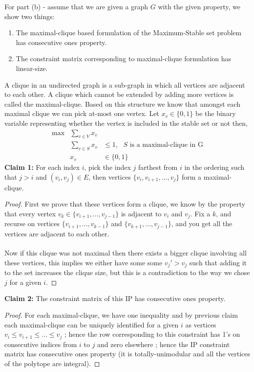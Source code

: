 \documentclass{article}
\numberwithin{equation}{section}
\begin{document}
For part (b) - assume that we are given a graph $G$ with the given property, we show two things: 
\begin{enumerate}
    \item The maximal-clique based formulation of the Maximum-Stable set problem has consecutive ones property. 
    \item The constraint matrix corresponding to maximal-clique formulation has linear-size. 
\end{enumerate}
A clique in an undirected graph is a sub-graph in which all vertices are adjacent to each other. A clique which cannot be extended by adding more vertices is called the maximal-clique. Based on this structure we know that amongst each maximal clique we can pick at-most one vertex. Let $x_v\in \{0, 1\}$ be the binary variable representing whether the vertex is included in the stable set or not then, 
\begin{equation}
    \begin{array}{crl}
        \max & \sum_{v \in V} x_v &\\
         & \sum_{v\in S} x_v &\le 1, \, \, \, \, S \text{ is a maximal-clique in G}\\
         & x_v&\in \{0, 1\}
    \end{array}
\end{equation}
\textbf{Claim 1:} For each index $i$, pick the index $j$ farthest from $i$ in the ordering such that $j > i$ and $(v_i, v_j) \in E$, then vertices $\{v_i, v_{i+1}, \dots, v_j\}$ form a maximal-clique. 
\begin{proof}
    First we prove that these vertices form a clique, we know by the property that every vertex $v_k\in \{v_{i+1}, \dots, v_{j-1}\}$ is adjacent to $v_i$ and $v_j$. Fix a $k$, and recurse on vertices $\{v_{i+1}, \dots, v_{k-1}\}$ and $\{v_{k+1}, \dots, v_{j-1}\}$, and you get all the vertices are adjacent to each other.\\\\
    Now if this clique was not maximal then there exists a bigger clique involving all these vertices, this implies we either have some some $v_j'>v_j$ such that adding it to the set increases the clique size, but this is a contradiction to the way we chose $j$ for a given $i$. 
 \end{proof}
 \noindent \textbf{Claim 2:} The constraint matrix of this IP has consecutive ones property. 
 \begin{proof}
     For each maximal-clique, we have one inequality and by previous claim each maximal-clique can be uniquely identified for a given $i$ as vertices $v_i\le v_{i+1}\le\dots\le v_{j} $ ; hence the row corresponding to this constraint has 1's on consecutive indices from $i\text{ to }j$ and zero elsewhere ; hence the IP constraint matrix has consecutive ones property (it is totally-unimodular and all the vertices of the polytope are integral). 
 \end{proof}
\end{document}
